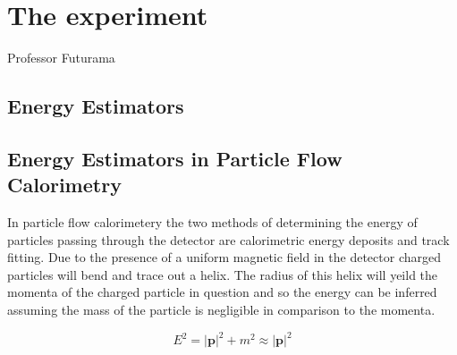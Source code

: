 \chapter{The \LHCb experiment}
\label{chap:MoreStuff}

{Professor Futurama}

\section{Energy Estimators}


\section{Energy Estimators in Particle Flow Calorimetry}
\label{sec:EnergyEstimatoresPFC}

In particle flow calorimetery the two methods of determining the energy of particles passing through the detector are calorimetric energy deposits and track fitting.  Due to the presence of a uniform magnetic field in the detector charged particles will bend and trace out a helix.  The radius of this helix will yeild the momenta of the charged particle in question and so the energy can be inferred assuming the mass of the particle is negligible in comparison to the momenta.

\begin{subequations}
  \label{eq:momentumApprox}
  \begin{equation}
    E^2 = | \mathbf{p} |^2 + m^2 \approx | \mathbf{p} |^2  
    \label{eq:momentumApprox1}
  \end{equation}
\end{subequations}


